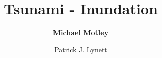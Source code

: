 %
%
%


%
%
%
%
%
%
%
%

\title{Tsunami - Inundation}
\author{
    \textbf{Michael Motley} 
    \and Patrick J. Lynett}
\tocauthor{}
%
%
\maketitle

